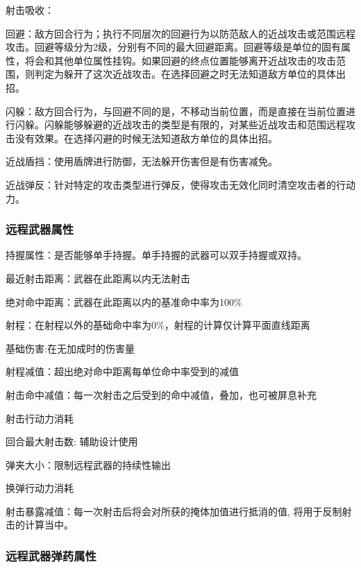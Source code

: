 \documentclass[10pt, a4paper]{article}
\begin{document}
        射击吸收：

        \medskip

        回避：敌方回合行为；执行不同层次的回避行为以防范敌人的近战攻击或范围远程攻击。回避等级分为2级，分别有不同的最大回避距离。回避等级是单位的固有属性，将会和其他单位属性挂钩。如果回避的终点位置能够离开近战攻击的攻击范围，则判定为躲开了这次近战攻击。在选择回避之时无法知道敌方单位的具体出招。

        闪躲：敌方回合行为，与回避不同的是，不移动当前位置，而是直接在当前位置进行闪躲。闪躲能够躲避的近战攻击的类型是有限的，对某些近战攻击和范围远程攻击没有效果。在选择闪避的时候无法知道敌方单位的具体出招。

        近战盾挡：使用盾牌进行防御，无法躲开伤害但是有伤害减免。

        近战弹反：针对特定的攻击类型进行弹反，使得攻击无效化同时清空攻击者的行动力。
        

    \subsubsection*{远程武器属性}
        
        持握属性：是否能够单手持握。单手持握的武器可以双手持握或双持。

        最近射击距离：武器在此距离以内无法射击

        绝对命中距离：武器在此距离以内的基准命中率为100\%

        射程：在射程以外的基础命中率为0\%，射程的计算仅计算平面直线距离

        基础伤害:在无加成时的伤害量

        射程减值：超出绝对命中距离每单位命中率受到的减值

        射击命中减值：每一次射击之后受到的命中减值，叠加，也可被屏息补充

        射击行动力消耗

        回合最大射击数: 辅助设计使用

        弹夹大小：限制远程武器的持续性输出

        换弹行动力消耗

        射击暴露减值：每一次射击后将会对所获的{\color{red}掩体加值}进行抵消的值, 将用于反制射击的计算当中。

        \medskip

    \subsubsection*{远程武器弹药属性}
        
\end{document}
